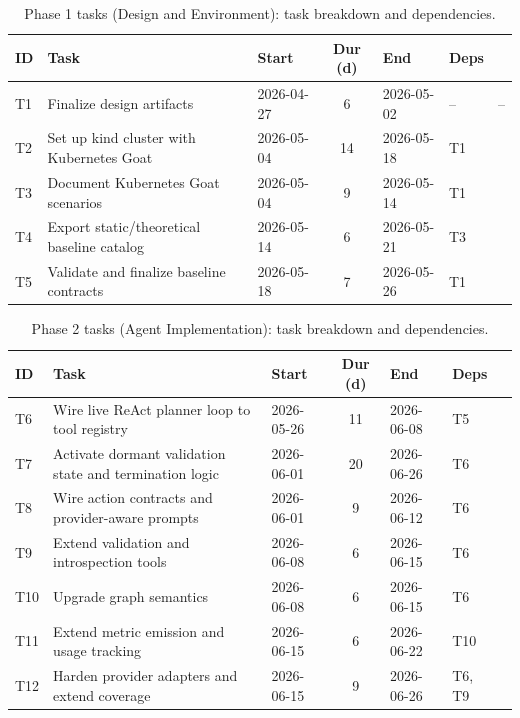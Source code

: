 \documentclass[conference]{IEEEtran}
\begin{document}
\begin{table}[t!]
\centering
\caption{Phase 1 tasks (Design and Environment): task breakdown and dependencies.}
\label{tab:tasks_phase1}
\scriptsize
\setlength{\tabcolsep}{5pt}
\renewcommand{\arraystretch}{1.2}
\begin{tabularx}{\textwidth}{l X l c l l l}
\toprule
\textbf{ID} & \textbf{Task} & \textbf{Start} & \textbf{Dur (d)} & \textbf{End} & \textbf{Deps} \\
\midrule
T1 & Finalize design artifacts & 2026-04-27 & 6 & 2026-05-02 & -- & -- \\
T2 & Set up kind cluster with Kubernetes Goat & 2026-05-04 & 14 & 2026-05-18 & T1 \\
T3 & Document Kubernetes Goat scenarios & 2026-05-04 & 9 & 2026-05-14 & T1 \\
T4 & Export static/theoretical baseline catalog & 2026-05-14 & 6 & 2026-05-21 & T3 \\
T5 & Validate and finalize baseline contracts & 2026-05-18 & 7 & 2026-05-26 & T1 \\
\bottomrule
\end{tabularx}
\end{table}

\begin{table}[t!]
\centering
\caption{Phase 2 tasks (Agent Implementation): task breakdown and dependencies.}
\label{tab:tasks_phase2}
\scriptsize
\setlength{\tabcolsep}{5pt}
\renewcommand{\arraystretch}{1.2}
\begin{tabularx}{\textwidth}{l X l c l l l}
\toprule
\textbf{ID} & \textbf{Task} & \textbf{Start} & \textbf{Dur (d)} & \textbf{End} & \textbf{Deps} \\
\midrule
T6 & Wire live ReAct planner loop to tool registry & 2026-05-26 & 11 & 2026-06-08 & T5 \\
T7 & Activate dormant validation state and termination logic & 2026-06-01 & 20 & 2026-06-26 & T6 \\
T8 & Wire action contracts and provider-aware prompts & 2026-06-01 & 9 & 2026-06-12 & T6 \\
T9 & Extend validation and introspection tools & 2026-06-08 & 6 & 2026-06-15 & T6 \\
T10 & Upgrade graph semantics & 2026-06-08 & 6 & 2026-06-15 & T6 \\
T11 & Extend metric emission and usage tracking & 2026-06-15 & 6 & 2026-06-22 & T10 \\
T12 & Harden provider adapters and extend coverage & 2026-06-15 & 9 & 2026-06-26 & T6, T9 \\
\bottomrule
\end{tabularx}
\end{table}
\end{document}
